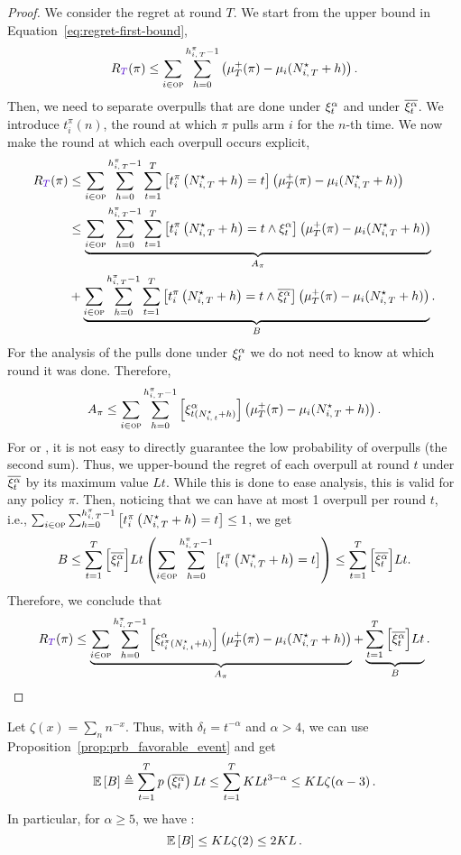 \begin{proof}
We consider the regret at round $T$. We start from the upper bound in Equation~\ref{eq:regret-first-bound}, 
\begin{equation}
\regret(\pi) \leq \sum_{i\in \overpullSet}   \sum_{h=0}^{\hiTpi-1} \pa{\mu^+_T(\pi) - \mu_i(\NiT^{\star} + h)}.
\end{equation}
Then, we need to separate overpulls that are done under $\xi^\alpha_t$ and under $\overline{\xi^\alpha_t}$. We introduce $t_i^{\pi}(n)$, the round at which $\pi$ pulls arm $i$ for the $n$-th time. We now make the round at which each overpull occurs  explicit,
\begin{align*}
\regret(\pi) & \leq \sum_{i\in \overpullSet}   \sum_{h=0}^{\hiTpi-1} \sum_{t=1}^T \left[ t_i^{\pi}\pa{\NiT^{\star} + h} = t \right]  \pa{\mu^+_T(\pi) - \mu_i(\NiT^{\star} + h)}\\
& \leq \underbrace{\sum_{i\in \overpullSet}   \sum_{h=0}^{\hiTpi-1} \sum_{t=1}^T \left[ t_i^{\pi}\pa{\NiT^{\star} + h} = t \land \HPevent \right] \pa{\mu^+_T(\pi) - \mu_i(\NiT^{\star} + h)}}_{A_\pi}\\
&+ \underbrace{\sum_{i\in \overpullSet}\sum_{h=0}^{\hiTpi-1} \sum_{t=1}^T \left[ t_i^{\pi}\pa{\NiT^{\star} + h} = t \land \bar{\HPevent} \right]\pa{\mu^+_T(\pi) - \mu_i(\NiT^{\star} + h)}}_B.
\end{align*}
For the analysis of the pulls done under $\xi^\alpha_t$ we do not need to know at which round it was done. Therefore, 
\[
A_\pi \leq \sum_{i\in \textsc{op}}   \sum_{h=0}^{h_{i,\,T}^\pi-1}  \left[ \xi^\alpha_{t(N_{i,\,t}^\star + h)} \right] \left(\mu^+_T(\pi) - \mu_i(N_{i,\,T}^{\star} + h)\right).
\]
For \FEWA or \RUCB, it is not easy to directly guarantee the low probability of overpulls (the second sum). Thus, we upper-bound the regret of each overpull at round $t$ under $\overline{\xi^\alpha_t}$ by its maximum value $Lt$. While this is done to ease \myAlgorithm analysis, this is valid for any policy $\pi$. Then, noticing that we can have at most 1 overpull per round $t$, i.e., $\sum_{i\in \textsc{op}}\sum_{h=0}^{h_{i,\,T}^\pi-1}\left[ t_i^{\pi}\left(N_{i,\,T}^{\star} + h\right) = t  \right] \leq 1$, we get
\[
B \leq  \sum_{t=1}^T \Big[\overline{\xi^\alpha_t}\Big] Lt\left(\sum_{i\in \textsc{op}}\sum_{h=0}^{h_{i,\,T}^\pi-1}\left[ t_i^{\pi}\left(N_{i,\,T}^{\star} + h\right) = t  \right]\right) \leq  \sum_{t=1}^T \Big[\overline{\xi^\alpha_t}\Big] Lt.
\]
Therefore, we conclude that
\[
\regret(\pi) \leq \underbrace{\sum_{i\in \overpullSet} \sum_{h=0}^{\hiTpi-1} \left[ \xi^\alpha_{t_i^\pi(\Nit^\star + h)} \right]\pa{\mu^+_T(\pi) - \mu_i(\NiT^{\star} + h)}}_{A_{\pi}} + \underbrace{\sum_{t=1}^T \Big[\bar{\HPevent}\Big] Lt}_B. 
\]
\end{proof}
\begin{lemma}
\label{lem:rested-B}
Let $\zeta(x) = \sum_n n^{-x}$. Thus, with $\delta_t = t^{-\alpha}$ and $\alpha > 4$, we can use Proposition~\ref{prop:prb_favorable_event} and get
\[
\mathbb{E}\left[B\right] \triangleq \sum_{t=1}^T p\left(\overline{\xi^\alpha_t}\right)Lt \leq \sum_{t=1}^T KLt^{3-\alpha}\leq KL \zeta(\alpha -3)\, .
\]
In particular, for $\alpha \geq 5$, we have :
\[
\mathbb{E}\left[B\right] \leq KL\zeta(2) \leq 2KL\, .
\]
\end{lemma}

